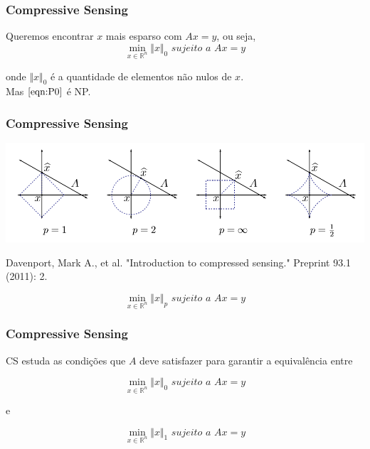 \documentclass[11pt]{beamer}
\begin{document}
\begin{frame}
\frametitle{Compressive Sensing}
Queremos encontrar $x$ mais esparso com $Ax = y$, ou seja,
\begin{equation}
\min_{x \in \mathbb{R}^n} \Vert x \Vert_0 \textit{ sujeito a } Ax = y
\tag{$P_0$}
\label{eqn:P0}
\end{equation}

onde $\Vert x \Vert_0$ é a quantidade de elementos não nulos de $x$. \\

Mas $\eqref{eqn:P0}$ é NP.
\end{frame}

\begin{frame}
\frametitle{Compressive Sensing}
\begin{center}
\includegraphics[scale=.4]{imagens/normas.png}

\tiny{Davenport, Mark A., et al. "Introduction to compressed sensing." Preprint 93.1 (2011): 2.}
\end{center}
\begin{equation}
\min_{x \in \mathbb{R}^n} \Vert x \Vert_p \textit{ sujeito a } Ax = y
\tag{$P_p$}
\label{eqn:Pp}
\end{equation}
\end{frame}

\begin{frame}
\frametitle{Compressive Sensing}
CS estuda as condições que $A$ deve satisfazer para garantir a equivalência entre

\begin{equation}
\min_{x \in \mathbb{R}^n} \Vert x \Vert_0 \textit{ sujeito a } Ax = y
\tag{$P_0$}
\end{equation}

e

\begin{equation}
\min_{x \in \mathbb{R}^n} \Vert x \Vert_1 \textit{ sujeito a } Ax = y
\tag{$P_1$}
\label{eqn:P1}
\end{equation}
\end{frame}
\end{document}
